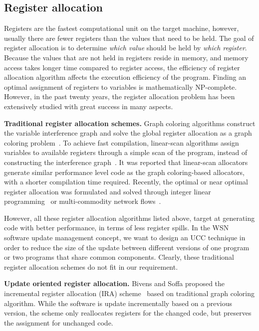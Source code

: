\subsection{Register allocation}

Registers are the fastest computational unit on the target machine, however, usually there are fewer registers than the 
values that need to be held. The goal of register allocation is to determine {\it which value} should be held by {\it 
which register}. Because the values that are not held in registers reside in memory, and memory access takes longer 
time compared to register access, the efficiency of register allocation algorithm affects the execution efficiency of 
the program. 
Finding an optimal assignment of registers to variables is mathematically NP-complete. However, in the past twenty 
years, the register allocation problem has been extensively studied with great success in many aspects. 

\textbf{Traditional register allocation schemes.} 
Graph coloring algorithms construct the variable interference graph and solve the global register allocation as a graph 
coloring 
problem~\cite{related:graph-color,related:graph-color-improvements,related:graph-color-iterated,related:graph-color-prio
rity}. To achieve fast compilation, linear-scan algorithms assign variables to available registers through a simple 
scan of the program, instead of constructing the interference 
graph~\cite{related:linear-scan,related:linear-scan-fast}. It was reported that linear-scan allocators generate similar 
performance level code as the graph coloring-based allocators, with a shorter compilation time required. Recently, the 
optimal or near optimal register allocation was formulated and solved through integer linear 
programming~\cite{related:ilp,related:ilp-cisc,related:ilp-fast} or multi-commodity network 
flows~\cite{related:ilp-progressive}.

However, all these register allocation algorithms listed above, target at generating code with better performance, in 
terms of less register spills. In the WSN software update management concept, we want to design an UCC technique in 
order to reduce the size of the update between different versions of one program or two programs that share common 
components. Clearly, these traditional register allocation schemes do not fit in our requirement.

\textbf{Update oriented register allocation.}
Bivens and Soffa proposed the incremental register allocation (IRA) scheme~\cite{related:ira} based on traditional 
graph coloring algorithm. While the software is update incrementally based on a previous version, the scheme only 
reallocates registers for the changed code, but preserves the assignment for unchanged code. 

